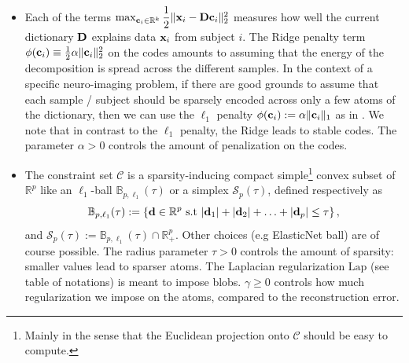 \begin{itemize}
\item Each of the terms $\max_{\mathbf{c}_i \in \mathbb R^k}\dfrac{1}{2}\|\mathbf{x}_i-\mathbf{D}\mathbf{c}_i\|_2^2$ measures how well the current dictionary $\mathbf{D}$ explains data $\mathbf{x}_i$ from subject $i$.
The Ridge penalty term $\phi(\mathbf{c}_i) \equiv \frac{1}{2}\alpha\|\mathbf{c}_i\|_2^2$
on the codes amounts to assuming that the energy of the decomposition is
spread across the different samples. In the context of a specific
neuro-imaging problem, if there are good grounds to assume that each
sample / subject should be sparsely encoded across only a few atoms of
the dictionary, then we can use the $\ell_1$ penalty $\phi(\mathbf{c}_i) :=
\alpha\|\mathbf{c}_i\|_1$ as in   \citep{mairal2010}. We note that in contrast to
the $\ell_1$ penalty, the Ridge leads to stable codes. The parameter $\alpha > 0$ controls the amount of penalization on the codes. %


\item The constraint set $\mathcal C$ is a sparsity-inducing compact
simple\footnote{Mainly in the sense that the Euclidean projection onto
$\mathcal C$ should be easy to compute.} convex subset of $\mathbb R^p$
like an $\ell_1$-ball $\mathbb B_{p,\ell_1}(\tau)$ or a simplex $\mathcal S_p(\tau)$, defined respectively as $$\mathbb B_{p,\ell_1}(\tau) := \left\{\mathbf{d} \in \mathbb R^p\text{ s.t }|\mathbf{d}_1| + |\mathbf{d}_2| + \ldots + |\mathbf{d}_p| \le \tau\right\},$$
and
$\mathcal S_p(\tau) := \mathbb B_{p,\ell_1}(\tau) \cap \mathbb R_+^p.$
Other choices (e.g ElasticNet ball) are of course possible. The radius parameter $\tau > 0$ controls the
amount of sparsity: smaller values lead to sparser atoms.
The Laplacian regularization $\text{Lap}$ (see table of notations) is meant to impose blobs.
$\gamma \ge 0$ controls how much regularization we impose on the atoms, compared to the
reconstruction error.

\end{itemize}
